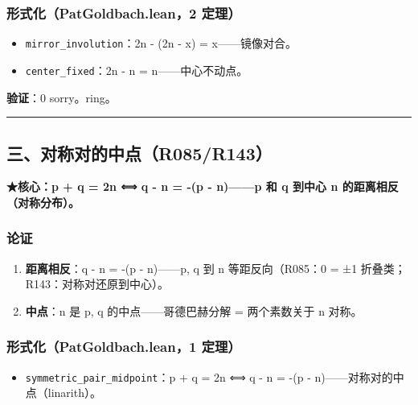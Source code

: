 \documentclass[
]{article}
\providecommand{\tightlist}{%
 \setlength{\itemsep}{0pt}\setlength{\parskip}{0pt}}
\begin{document}
\subsubsection{形式化（PatGoldbach.lean，2
定理）}\label{ux5f62ux5f0fux5316patgoldbach.lean2-ux5b9aux7406}

\begin{itemize}
\tightlist
\item
 \texttt{mirror\_involution}：2n - (2n - x) = x------镜像对合。
\item
 \texttt{center\_fixed}：2n - n = n------中心不动点。
\end{itemize}

\textbf{验证}：0 sorry。ring。

\begin{center}\rule{0.5\linewidth}{0.5pt}\end{center}

\subsection{三、对称对的中点（R085/R143）}\label{ux4e09ux5bf9ux79f0ux5bf9ux7684ux4e2dux70b9r085r143}

\textbf{★核心：p + q = 2n ⟺ q - n = -(p - n)------p 和 q 到中心 n
的距离相反（对称分布）。}

\subsubsection{论证}\label{ux8bbaux8bc1-2}

\begin{enumerate}
\def\labelenumi{\arabic{enumi}.}
\tightlist
\item
 \textbf{距离相反}：q - n = -(p - n)------p, q 到 n 等距反向（R085：0 =
 ±1 折叠类；R143：对称对还原到中心）。
\item
 \textbf{中点}：n 是 p, q 的中点------哥德巴赫分解 = 两个素数关于 n
 对称。
\end{enumerate}

\subsubsection{形式化（PatGoldbach.lean，1
定理）}\label{ux5f62ux5f0fux5316patgoldbach.lean1-ux5b9aux7406-1}

\begin{itemize}
\tightlist
\item
 \texttt{symmetric\_pair\_midpoint}：p + q = 2n ⟺ q - n = -(p -
 n)------对称对的中点（linarith）。
\end{itemize}
\end{document}
